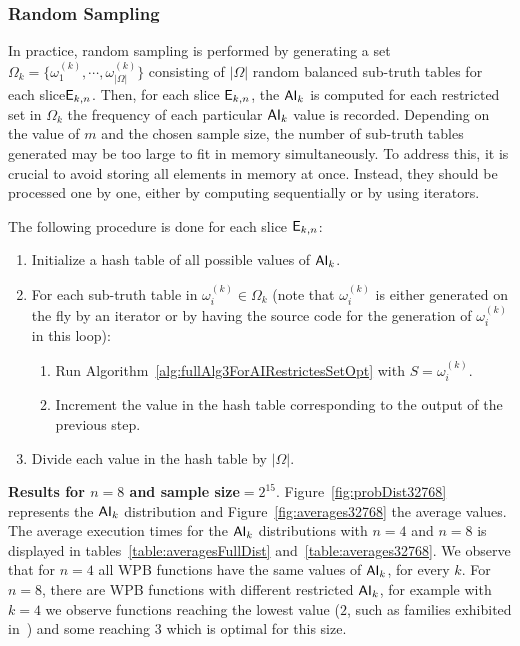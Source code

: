 \documentclass[11pt]{llncs}
\begin{document}
\subsubsection{Random Sampling}
In practice, random sampling is performed by generating a set $\Omega_k = \{\omega_1^{(k)}, \cdots, \omega_{|\Omega|}^{(k)}\}$ consisting of $|\Omega|$ random balanced sub-truth tables for each slice$ \mathsf{E}_{k,n}$. 
Then, for each slice $\mathsf{E}_{k,n}$, the $\mathsf{AI}_{k}$ is computed for each restricted set in $\Omega_k$ the frequency of each particular $\mathsf{AI}_{k}$ value is recorded.
Depending on the value of $m$ and the chosen sample size, the number of sub-truth tables generated may be too large to fit in memory simultaneously. 
To address this, it is crucial to avoid storing all elements in memory at once. 
Instead, they should be processed one by one, either by computing sequentially or by using iterators.





The following procedure is done for each slice $\mathsf{E}_{k,n}$:
\begin{enumerate}
    \item Initialize a hash table of all possible values of $\mathsf{AI}_{k}$.
    \item For each sub-truth table in $\omega_i^{(k)} \in \Omega_k$ (note that $\omega_i^{(k)}$ is either generated on the fly by an iterator or by having the source code for the generation of $\omega_i^{(k)}$ in this loop)\footnotemark:
    \begin{enumerate}
        \item Run Algorithm~\ref{alg:fullAlg3ForAIRestrictesSetOpt} with $S=\omega_i^{(k)}$\label{enum:stepOfapplicationEnum}.
        \item Increment the value in the hash table corresponding to the output of the previous step.
    \end{enumerate}
    \item Divide each value in the hash table by $|\Omega|$.
\end{enumerate}

\noindent
\textbf{Results for $n=8$ and sample size$=2^{15}$}.
Figure~\ref{fig:probDist32768} represents the $\mathsf{AI}_{k}$ distribution and Figure~\ref{fig:averages32768} the average values. 
The average execution times for the $\mathsf{AI}_{k}$ distributions with $n=4$ and $n=8$ is displayed in tables~\ref{table:averagesFullDist} and~\ref{table:averages32768}. 
We observe that for $n=4$ all WPB functions have the same values of $\mathsf{AI}_{k}$, for every $k$. 
For $n=8$, there are WPB functions with different restricted $\mathsf{AI}_{k}$, for example with $k=4$ we observe functions reaching the lowest value ($2$, such as families exhibited in~\cite{Latin:GinMea23}) and some reaching $3$ which is optimal for this size.
\end{document}
